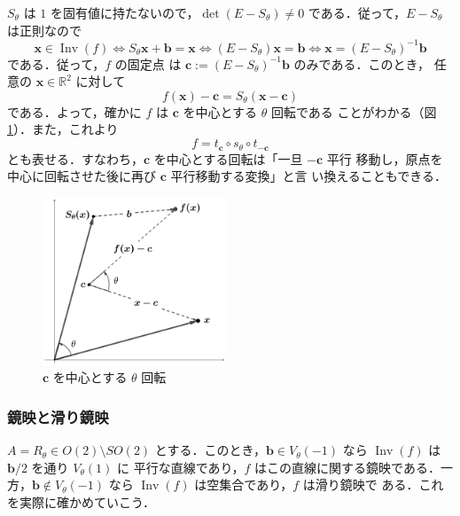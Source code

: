 \documentclass[11pt, uplatex, dvipdfmx, titlepage]{jsarticle}
\DeclareMathOperator{\Inv}{Inv}
\theoremstyle{definition}
\begin{document}
$S_{\theta}$ は $1$ を固有値に持たないので，$\det(E-S_{\theta}) \neq
0$ である．従って，$E-S_{\theta}$ は正則なので
\[
  \bm{x} \in \Inv(f) \Leftrightarrow S_{\theta} \bm{x} +\bm{b} =
  \bm{x} \Leftrightarrow (E-S_{\theta})\bm{x} = \bm{b} \Leftrightarrow
  \bm{x} = \left( E-S_{\theta}\right)^{-1} \bm{b}
\]
である．従って，$f$ の固定点
は $\bm{c}:=\left(E-S_{\theta}\right)^{-1}\bm{b}$ のみである．このとき，
任意の $\bm{x} \in \mathbb{R}^2$ に対して
\[
  f(\bm{x}) - \bm{c} = S_{\theta}(\bm{x}-\bm{c})
\]
である．よって，確かに $f$ は $\bm{c}$ を中心とする $\theta$ 回転である
ことがわかる（図\ref{fig:rotation2gen}）．また，これより
\[
  f = t_{\bm{c}} \circ s_{\theta} \circ t_{-\bm{c}}
\]
とも表せる．すなわち，$\bm{c}$ を中心とする回転は「一旦 $-\bm{c}$ 平行
移動し，原点を中心に回転させた後に再び $\bm{c}$ 平行移動する変換」と言
い換えることもできる．
\begin{figure}[h]
  \centering
  \includegraphics[height=5cm]{pictures/rotation2gen.pdf}
  \caption{$\bm{c}$ を中心とする $\theta$ 回転}
  \label{fig:rotation2gen}
\end{figure}


\subsubsection{鏡映と滑り鏡映}\label{sec:reflection2}

$A=R_{\theta} \in O(2) \setminus SO(2)$
とする．このとき，$\bm{b} \in
V_{\theta}(-1)$ なら $\Inv(f)$ は $\bm{b}/2$ を通り $V_{\theta}(1)$ に
平行な直線であり，$f$ はこの直線に関する鏡映である．一方，$\bm{b}
\notin V_{\theta}(-1)$ なら $\Inv(f)$ は空集合であり，$f$ は滑り鏡映で
ある．これを実際に確かめていこう．
\end{document}
